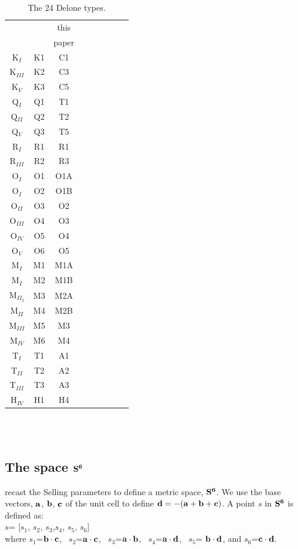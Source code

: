 \documentclass[preprint]{iucr}              %
\newcommand{\SVI}[0]{$\bf{S^{6}}$}
\newcommand{\scalarsub}[2]{$#1_#2$}
\newcommand{\vdotv}[2]{${{\bf #1 \cdot #2}}$}
\begin{document}
\begin{table}
	\begin{tabular}{ccccccccc}
		\toprule
		 \cite{Delaunay1932} & \cite{Burzlaff1985}   &this  \\
		&  & paper \\
		\midrule
		K$_I$ & K1 & C1 \\		
		K$_{III}$ & K2 & C3 \\		
		K$_V$ & K3 & C5 \\		
		Q$_I$ & Q1 & T1 \\		
		Q$_{II}$ & Q2 & T2 \\		
		Q$_V$ & Q3 & T5\\		
		R$_I$ & R1 & R1 \\		
		R$_{III}$ & R2 & R3 \\		
		O$_I$ & O1 & O1A  \\		
		O$_I$ & O2 & O1B  \\		
		O$_{II}$ & O3 & O2   \\		
		O$_{III}$ & O4 & O3   \\		
		O$_{IV}$ & O5 & O4   \\		
		O$_V$ & O6 & O5   \\		
		M$_I$ & M1 & M1A  \\		
		M$_I$ & M2 & M1B  \\		
		M$_{II_2}$  & M3 & M2A  \\		
		M$_{II}$ & M4 & M2B  \\		
		M$_{III}$ & M5 & M3  \\		
		M$_{IV}$ & M6 & M4  \\		
		T$_I$ & T1 & A1  \\ 		
		T$_{II}$ & T2 & A2 \\		
		T$_{III}$ & T3 & A3 \\		
		H$_{IV}$  & H1 & H4 \\ 
		\bottomrule
	\end{tabular}
~\\ ~\\
	\caption{The 24 Delone types. \cite{Delaunay1932}}
	\label{table:DeloneTypeConcordance}
\end{table}

\subsection{The space \SVI{}}
\cite{andrews2019} recast the Selling parameters to define a metric space, \SVI{}.
We use the base vectors, $\bf{a}$, $\bf{b}$, $\bf{c}$ of the unit cell to define $\bf{d}=-(\bf{a}+\bf{b}+\bf{c})$.
A point ${s}$ in \SVI{} is defined as:\\
${s}$= [\scalarsub{s}{1}, \scalarsub{s}{2}, \scalarsub{s}{3},\scalarsub{s}{4}, \scalarsub{s}{5}, \scalarsub{s}{6}] \\
where \scalarsub{s}{1}=\vdotv{b}{c}, ~\scalarsub{s}{2}=\vdotv{a}{c}, ~\scalarsub{s}{3}=\vdotv{a}{b}, 
~\scalarsub{s}{4}=\vdotv{a}{d}, ~\scalarsub{s}{5}= \vdotv{b}{d}, and \scalarsub{s}{6}=\vdotv{c}{d}.
\end{document}
